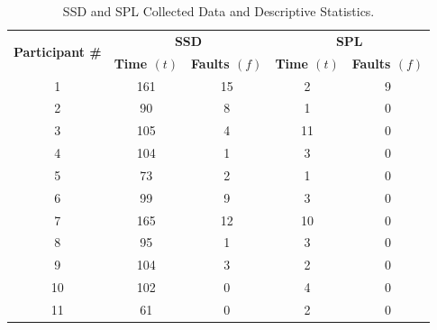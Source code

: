 \begin{table}
\caption{\label{tab:resul1}SSD and SPL Collected Data and Descriptive Statistics.}
    \centering
    \scriptsize
\begin{tabular}{c|c|c|c|c}
\hline
\multirow{2}{*}{\textbf{Participant \#}} & \multicolumn{2}{c|}{\textbf{SSD}} & \multicolumn{2}{c}{\textbf{SPL}}  \\ \cline{2-5}
                                    & \textbf{Time $(t)$}   & \textbf{Faults $(f)$} & \textbf{Time $(t)$}  & \textbf{Faults $(f)$}                                  \\ \hline
1                                   & 161             & 15              & 2              & 9                                              \\ \hline
2                                   & 90              & 8               & 1              & 0                                             \\ \hline
3                                   & 105             & 4               & 11             & 0                                              \\ \hline
4                                   & 104             & 1               & 3              & 0                                             \\ \hline
5                                   & 73              & 2               & 1              & 0                                             \\ \hline
6                                   & 99              & 9               & 3              & 0                                              \\ \hline
7                                   & 165             & 12              & 10             & 0                                              \\ \hline
8                                   & 95              & 1               & 3              & 0                                              \\ \hline
9                                   & 104             & 3               & 2              & 0                                               \\ \hline
10                                  & 102             & 0               & 4              & 0                                              \\ \hline
11                                  & 61              & 0               & 2              & 0                                             \\ \hline

\end{tabular}
\end{table}
